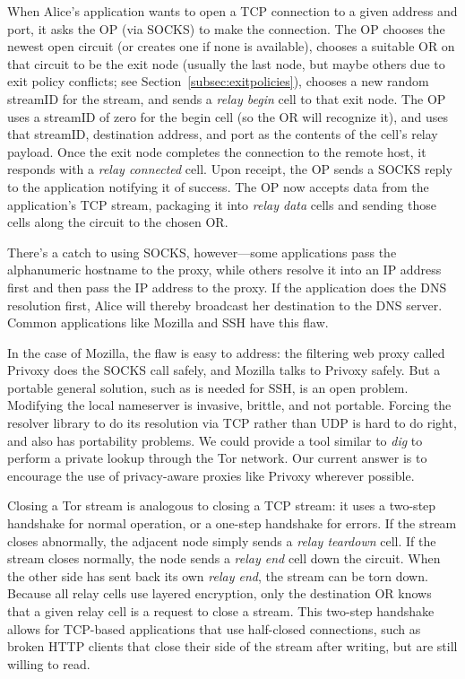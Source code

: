 \documentclass[times,10pt,twocolumn]{article}
\begin{document}
\label{subsec:tcp}

When Alice's application wants to open a TCP connection to a given
address and port, it asks the OP (via SOCKS) to make the
connection. The OP chooses the newest open circuit (or creates one if
none is available), chooses a suitable OR on that circuit to be the
exit node (usually the last node, but maybe others due to exit policy
conflicts; see Section~\ref{subsec:exitpolicies}), chooses a new
random streamID for the stream, and sends a \emph{relay begin} cell
to that exit node.  The OP uses a streamID of zero for the begin cell
(so the OR will recognize it), and uses that streamID, destination
address, and port as the contents of the cell's relay payload.  Once the
exit node completes the connection to the remote host, it responds
with a \emph{relay connected} cell.  Upon receipt, the OP sends a
SOCKS reply to the application notifying it of success. The OP
now accepts data from the application's TCP stream, packaging it into
\emph{relay data} cells and sending those cells along the circuit to
the chosen OR.

There's a catch to using SOCKS, however---some applications pass the
alphanumeric hostname to the proxy, while others resolve it into an IP
address first and then pass the IP address to the proxy.  If the
application does the DNS resolution first, Alice will thereby
broadcast her destination to the DNS server.  Common applications
like Mozilla and SSH have this flaw.

In the case of Mozilla, the flaw is easy to address: the filtering web
proxy called Privoxy does the SOCKS call safely, and Mozilla talks to
Privoxy safely. But a portable general solution, such as is needed for
SSH, is
an open problem. Modifying the local nameserver
is invasive, brittle, and not portable. Forcing the resolver
library to do its resolution via TCP rather than UDP is
hard to do right, and also has portability problems. We could provide a
tool similar to \emph{dig} to perform a private lookup through the
Tor network. Our current answer is to encourage the use of
privacy-aware proxies like Privoxy wherever possible.

Closing a Tor stream is analogous to closing a TCP stream: it uses a
two-step handshake for normal operation, or a one-step handshake for
errors. If the stream closes abnormally, the adjacent node simply sends a
\emph{relay teardown} cell. If the stream closes normally, the node sends
a \emph{relay end} cell down the circuit. When the other side has sent
back its own \emph{relay end}, the stream can be torn down.  Because
all relay cells use layered encryption, only the destination OR knows
that a given relay cell is a request to close a stream.  This two-step
handshake allows for TCP-based applications that use half-closed
connections, such as broken HTTP clients that close their side of the
stream after writing, but are still willing to read.
\end{document}
